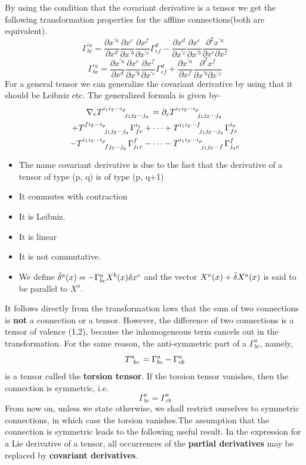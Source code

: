\documentclass[12pt,a4paper]{article}
\numberwithin{table}{section}
\numberwithin{figure}{section}
\numberwithin{equation}{section}
\theoremstyle{remark}
\theoremstyle{definition}
\begin{document}
By using the condition that the covariant derivative is a tensor we get the following transformation properties for the affline connections(both are equivalent).
$$\Gamma^{'a}_{bc}=\dfrac{\partial x^{'a}}{\partial x^d}\dfrac{\partial x^{e}}{\partial x^{'b}}\dfrac{\partial x^{f}}{\partial x^{'c}}\Gamma^{d}_{ef}-\dfrac{\partial x^{d}}{\partial x^{'c}}\dfrac{\partial x^{e}}{\partial x^{'b}}\dfrac{\partial^2 x^{'a}}{\partial x^e \partial x^f} $$
$$\Gamma^{'a}_{bc}=\dfrac{\partial x^{'a}}{\partial x^d}\dfrac{\partial x^{e}}{\partial x^{'b}}\dfrac{\partial x^{f}}{\partial x^{'c}}\Gamma^{d}_{ef}+ \dfrac{\partial x^{'a}}{\partial x^{f}}\dfrac{\partial^2 x^f}{\partial x^{'b} \partial x^{'c}} $$
For a general tensor we can generalize the covariant derivative by using that it should be Leibniz etc. The generalized formula is given by-
\begin{multline*}
\nabla_e \tensor{T}{^{i_1i_2\cdots i_p}_{j_1j_2\cdots j_q}} =\partial_e\tensor{T}{^{i_1i_2\cdots i_p}_{j_1j_2\cdots j_q }}\\
+\tensor{T}{^{fi_2\cdots i_p}_{j_1j_2\cdots j_q }}\Gamma^{i_1}_{fe}+\cdots+\tensor{T}{^{i_1i_2\cdots f}_{j_1j_2\cdots j_q }}\Gamma^{i_p}_{fe}\\-\tensor{T}{^{i_1i_2\cdots i_p}_{fj_2\cdots j_q}}\Gamma^{f}_{j_1e}-\cdots-\tensor{T}{^{i_1i_2\cdots i_p}_{j_1j_2\cdots f}}\Gamma^{f}_{j_qe}
\end{multline*}
\begin{itemize}
    \item The name covariant derivative is due to the fact that the derivative of a tensor of type (p, q) is of type (p, q+1)
    \item It commutes with contraction
    \item It is Leibniz.
    \item It is linear
    \item It is not commutative.
    \item We define $\Bar{\delta}^a(x)=-\Gamma^a_{bc}X^b(x)\delta x^c$ and the vector $X^a(x)+\Bar{\delta}X^a(x)$ is said to be parallel to $X^a$.
\end{itemize}
It follows directly from the transformation laws that the sum of two 
connections is \textbf{not} a connection or a tensor. However, the difference of two connections is a tensor of valence (1,2), because the inhomogeneous term cancels out in the transformation. For the same reason, the anti-symmetric part of a $\Gamma^a_{bc} $, namely,
$$\tensor{T}{^a_{bc}}=\Gamma^a_{bc}-\Gamma^a_{cb} $$
is a tensor called the \textbf{torsion tensor}. If the torsion tensor vanishes, then the 
connection is symmetric, i.e.
$$\Gamma^a_{bc}=\Gamma^a_{cb} $$
From now on, unless we state otherwise, we shall restrict ourselves to 
symmetric connections, in which case the torsion vanishes.The assumption 
that the connection is symmetric leads to the following useful result. In the 
expression for a Lie derivative of a tensor, all occurrences of the \textbf{partial derivatives} may be replaced by \textbf{covariant derivatives}.
\end{document}

